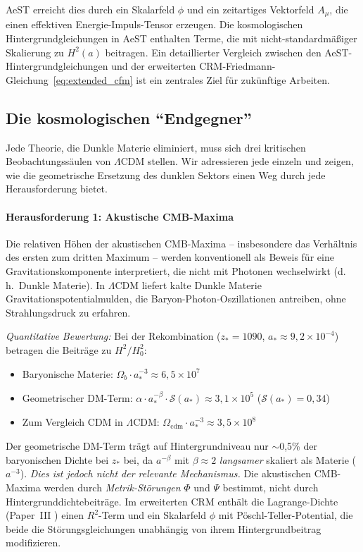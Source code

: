 \documentclass[aps,prd,twocolumn,superscriptaddress,nofootinbib]{revtex4-2}
\begin{document}
AeST erreicht dies durch ein Skalarfeld $\phi$ und ein zeitartiges Vektorfeld $A_\mu$, die einen effektiven Energie-Impuls-Tensor erzeugen. Die kosmologischen Hintergrundgleichungen in AeST enthalten Terme, die mit nicht-standardm\"aßiger Skalierung zu $H^2(a)$ beitragen. Ein detaillierter Vergleich zwischen den AeST-Hintergrundgleichungen und der erweiterten CRM-Friedmann-Gleichung~\eqref{eq:extended_cfm} ist ein zentrales Ziel f\"ur zuk\"unftige Arbeiten.

\subsection{Die kosmologischen "`Endgegner"'}
\label{subsec:endgegner}

Jede Theorie, die Dunkle Materie eliminiert, muss sich drei kritischen Beobachtungss\"aulen von $\Lambda$CDM stellen. Wir adressieren jede einzeln und zeigen, wie die geometrische Ersetzung des dunklen Sektors einen Weg durch jede Herausforderung bietet.

\paragraph{Herausforderung 1: Akustische CMB-Maxima}

Die relativen H\"ohen der akustischen CMB-Maxima -- insbesondere das Verh\"altnis des ersten zum dritten Maximum -- werden konventionell als Beweis f\"ur eine Gravitationskomponente interpretiert, die nicht mit Photonen wechselwirkt (d.\,h.\ Dunkle Materie). In $\Lambda$CDM liefert kalte Dunkle Materie Gravitationspotentialmulden, die Baryon-Photon-Oszillationen antreiben, ohne Strahlungsdruck zu erfahren.

\textit{Quantitative Bewertung:} Bei der Rekombination ($z_* = 1090$, $a_* \approx 9{,}2 \times 10^{-4}$) betragen die Beitr\"age zu $H^2/H_0^2$:
\begin{itemize}
\item Baryonische Materie: $\Omega_b \cdot a_*^{-3} \approx 6{,}5 \times 10^7$
\item Geometrischer DM-Term: $\alpha \cdot a_*^{-\beta} \cdot \mathcal{S}(a_*) \approx 3{,}1 \times 10^5$ \quad ($\mathcal{S}(a_*) = 0{,}34$)
\item Zum Vergleich CDM in $\Lambda$CDM: $\Omega_{\mathrm{cdm}} \cdot a_*^{-3} \approx 3{,}5 \times 10^8$
\end{itemize}

Der geometrische DM-Term tr\"agt auf Hintergrundniveau nur $\sim$0{,}5\% der baryonischen Dichte bei $z_*$ bei, da $a^{-\beta}$ mit $\beta \approx 2$ \textit{langsamer} skaliert als Materie ($a^{-3}$). \textit{Dies ist jedoch nicht der relevante Mechanismus.} Die akustischen CMB-Maxima werden durch \textit{Metrik-St\"orungen} $\Phi$ und $\Psi$ bestimmt, nicht durch Hintergrunddichtebeitr\"age. Im erweiterten CRM enth\"alt die Lagrange-Dichte (Paper~III \cite{Geiger2026c}) einen $R^2$-Term und ein Skalarfeld $\phi$ mit P\"oschl-Teller-Potential, die beide die St\"orungsgleichungen unabh\"angig von ihrem Hintergrundbeitrag modifizieren.
\end{document}

